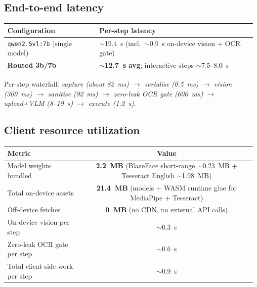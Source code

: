 \documentclass[11pt,a4paper]{article}
\newcommand{\code}[1]{\texttt{#1}}
\begin{document}
\subsection{End-to-end latency}
\begin{table}[H]
\centering
\small
\begin{tabularx}{\textwidth}{@{}>{\raggedright\arraybackslash}p{5.4cm} X@{}}
\toprule
\textbf{Configuration} & \textbf{Per-step latency}\\
\midrule
\code{qwen2.5vl:7b} (single model) & $\sim$19.4~s (incl.\ $\sim$0.9~s on-device vision + OCR gate)\\
\textbf{Routed 3b/7b} & \textbf{$\sim$12.7~s avg}; interactive steps $\sim$7.5--8.0~s\\
\bottomrule
\end{tabularx}
\end{table}

Per-step waterfall: \emph{capture (about 82~ms) $\rightarrow$ serialise (0.5~ms) $\rightarrow$ vision (300~ms) $\rightarrow$ sanitise (92~ms) $\rightarrow$ zero-leak OCR gate (600~ms) $\rightarrow$ upload+VLM (8--19~s) $\rightarrow$ execute (1.2~s).}

\subsection{Client resource utilization}
\begin{table}[H]
\centering
\small
\begin{tabularx}{\textwidth}{@{}>{\raggedright\arraybackslash}p{8.0cm} c@{}}
\toprule
\textbf{Metric} & \textbf{Value}\\
\midrule
Model weights bundled & \textbf{2.2~MB} (BlazeFace short-range $\sim$0.23~MB + Tesseract English $\sim$1.98~MB)\\
Total on-device assets & \textbf{21.4~MB} (models + WASM runtime glue for MediaPipe + Tesseract)\\
Off-device fetches & \textbf{0~MB} (no CDN, no external API calls)\\
On-device vision per step & $\sim$0.3~s\\
Zero-leak OCR gate per step & $\sim$0.6~s\\
Total client-side work per step & $\sim$0.9~s\\
\bottomrule
\end{tabularx}
\end{table}

\end{document}
